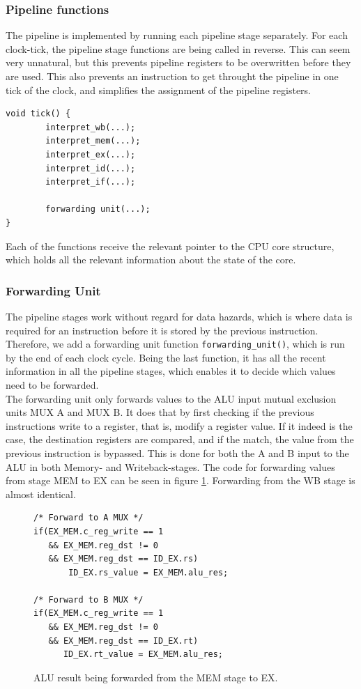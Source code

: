 \subsubsection{Pipeline functions}
The pipeline is implemented by running each pipeline stage separately. For each
clock-tick, the pipeline stage functions are being called in reverse. This can
seem very unnatural, but this prevents pipeline registers to be overwritten
before they are used. This also prevents an instruction to get throught the
pipeline in one tick of the clock, and simplifies the assignment of the pipeline
registers.
\begin{verbatim}
void tick() {
        interpret_wb(...);
        interpret_mem(...);
        interpret_ex(...);
        interpret_id(...);
        interpret_if(...);

        forwarding unit(...);
}
\end{verbatim}

Each of the functions receive the relevant pointer to the CPU core structure,
which holds all the relevant information about the state of the core.


\subsubsection{Forwarding Unit}
The pipeline stages work without regard for data hazards, which is where data
is required for an instruction before it is stored by the previous instruction.
Therefore, we add a forwarding unit function \texttt{forwarding\_unit()}, which
is run by the end of each clock cycle. Being the last function, it has all the
recent information in all the pipeline stages, which enables it to decide which
values need to be forwarded.\\
The forwarding unit only forwards values to the ALU input mutual exclusion
units MUX A and MUX B. It does that by first checking if the previous
instructions write to a register, that is, modify a register value. If it
indeed is the case, the destination registers are compared, and if the match,
the value from the previous instruction is bypassed. This is done for both the
A and B input to the ALU in both Memory- and Writeback-stages. The code for
forwarding values from stage MEM to EX can be seen in figure
\ref{fig:forwarding_unit_code}. Forwarding from the WB stage is almost
identical.

\begin{figure}[H]
\centering
\begin{lstlisting}[style=customc]
/* Forward to A MUX */
if(EX_MEM.c_reg_write == 1
   && EX_MEM.reg_dst != 0
   && EX_MEM.reg_dst == ID_EX.rs)
       ID_EX.rs_value = EX_MEM.alu_res;

/* Forward to B MUX */
if(EX_MEM.c_reg_write == 1
   && EX_MEM.reg_dst != 0
   && EX_MEM.reg_dst == ID_EX.rt)
      ID_EX.rt_value = EX_MEM.alu_res;
\end{lstlisting}
\caption{ALU result being forwarded from the MEM stage to EX.}
\label{fig:forwarding_unit_code}
\end{figure}

